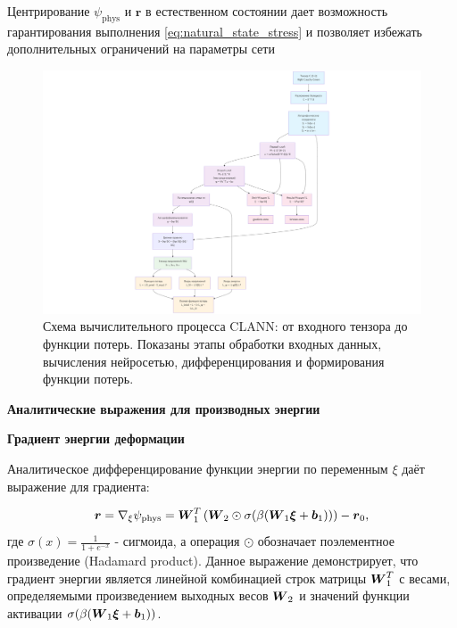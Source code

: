 Центрирование $\psi_{\mathrm{phys}}$ и $\mathbf{r}$ в естественном состоянии 
дает возможность гарантирования выполнения \eqref{eq:natural_state_stress} и
позволяет избежать дополнительных ограничений на параметры сети





\begin{figure}[htbp]
\centering
\includegraphics[width=1.3\textwidth]{img/clann_arc.png}
\caption{Схема вычислительного процесса CLANN: от входного тензора до функции потерь. Показаны этапы обработки входных данных, вычисления нейросетью, дифференцирования и формирования функции потерь.}
\label{fig:clann_architecture}
\end{figure}

\textbf{Аналитические выражения для производных энергии}

\textbf{Градиент энергии деформации}

Аналитическое дифференцирование функции энергии по переменным \(\xi\) даёт выражение для градиента:

\begin{equation}
 \boldsymbol{r} = \nabla_\xi \psi_{\mathrm{phys}} = \boldsymbol{W}_1^T \left( \boldsymbol{W}_2 \odot \sigma(\beta (\boldsymbol{W}_1 \boldsymbol{\xi} + \boldsymbol{b}_1)) \right) - \boldsymbol{r}_0,
\label{eq:energy_gradient}
\end{equation}
где $\sigma(x) = \frac{1}{1 + e^{-x}}$ - сигмоида, 
а операция $\odot$ обозначает поэлементное произведение (Hadamard product). 
Данное выражение демонстрирует, что градиент энергии является линейной комбинацией строк матрицы $\boldsymbol{W}_1^T$ с весами, 
определяемыми произведением выходных весов $\boldsymbol{W}_2$ и значений функции активации $\sigma(\beta (\boldsymbol{W}_1 \boldsymbol{\xi} + \boldsymbol{b}_1))$.

